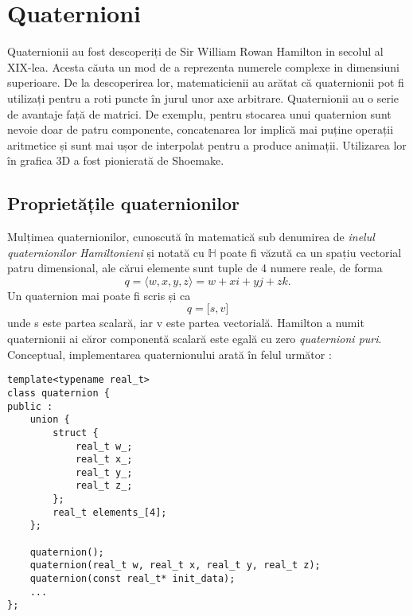 \section{Quaternioni}
\label{ch1:quaternions}
\indent

Quaternionii au fost descoperiți de Sir William Rowan Hamilton in secolul al
XIX-lea. Acesta căuta un mod de a reprezenta numerele complexe in dimensiuni
superioare. De la descoperirea lor, matematicienii au arătat că quaternionii pot
fi utilizați pentru a roti puncte în jurul unor axe arbitrare.
Quaternionii au o serie de avantaje față de matrici. De exemplu, pentru
stocarea unui quaternion sunt nevoie doar de patru componente, concatenarea lor
implică mai puține operații aritmetice și sunt mai ușor de interpolat pentru a
produce animații. Utilizarea lor în grafica 3D a fost pionierată de Shoemake.

\subsection{Proprietățile quaternionilor}
\label{ch1:quaternions:properties}
\indent

Mulțimea quaternionilor, cunoscută în matematică sub denumirea de \textit{inelul
quaternionilor Hamiltonieni} și notată cu $\mathbb{H}$ poate fi văzută ca
un spațiu vectorial patru dimensional, ale cărui elemente sunt tuple de 4
numere reale, de forma 
\begin{equation}
q = \langle w, x, y, z\rangle = w + x\mathit{i} + y\mathit{j} + z\mathit{k}.
\end{equation}
Un quaternion mai poate fi scris și ca 
\begin{equation}
q = \lbrack s, v \rbrack
\end{equation} unde s este partea scalară, iar v este partea vectorială.
Hamilton a numit quaternionii ai căror componentă scalară este egală cu zero
\textit{quaternioni puri}.
\newpage
Conceptual, implementarea quaternionului arată în felul următor :
\begin{lstlisting}[]
template<typename real_t>
class quaternion {
public :
    union {
        struct {
            real_t w_;
            real_t x_;
            real_t y_;
            real_t z_;
        };
        real_t elements_[4];
    };

    quaternion();
    quaternion(real_t w, real_t x, real_t y, real_t z);
    quaternion(const real_t* init_data);
    ...
};
\end{lstlisting}

